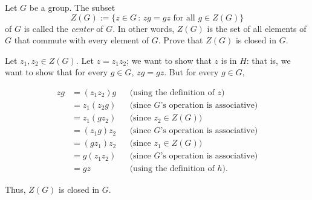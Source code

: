 \begin{exercise}[ID=2R, subtitle=(Extra Credit)]
Let $G$ be a group.  The subset $$Z(G):=\{z \in G\,:\, zg=gz \mbox{ for all }g\in Z(G)\}$$ of $G$ is called the \textit{center} of $G$. In other words, $Z(G)$ is the set of all elements of $G$ that commute with every element of $G$.
Prove that $Z(G)$ is closed in $G$. %
\end{exercise}

\begin{solution}[print=true]
Let $z_1, z_2\in Z(G)$.  Let $z=z_1z_2$; we want to
show that $z$ is in $H$: that is, we want to show that for every $g\in G$,
$zg=gz$.  But for every $g\in G$,
\begin{center}
\begin{align*}
zg&=(z_1z_2)g&& \text{(using the definition of $z$)}\\
&=z_1(z_2g)&& \text{(since $G$'s operation is associative)}\\
&=z_1(gz_2)&& \text{(since $z_2\in Z(G)$)}\\
&=(z_1g)z_2 && \text{(since $G$'s operation is associative)}\\
&=(gz_1)z_2 && \text{(since $z_1\in Z(G)$)}\\
&=g(z_1z_2)&&  \text{(since $G$'s operation is associative)}\\
&=gz && \text{(using the definition of $h$)}.
\end{align*}\end{center}
Thus, $Z(G)$ is closed in $G$.

\end{solution} 